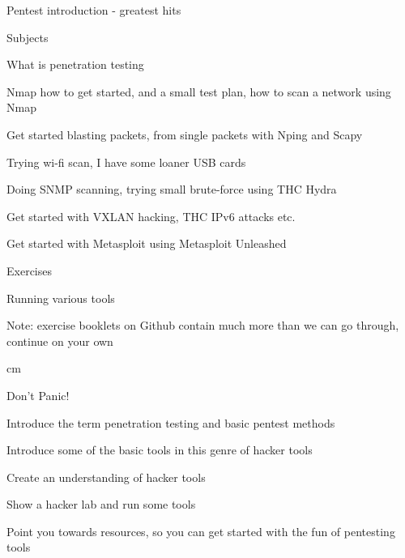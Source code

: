 \documentclass[Screen16to9,17pt]{foils}
\begin{document}
{}

\mytitlepage
{Pentest introduction - greatest hits}

\LogoOn



\begin{list1}
\item Subjects
\begin{list2}
\item What is penetration testing
\item Nmap how to get started, and a small test plan, how to scan a network using Nmap
\item Get started blasting packets, from single packets with Nping and Scapy
\item Trying wi-fi scan, I have some loaner USB cards
\item Doing SNMP scanning, trying small brute-force using THC Hydra
\item Get started with VXLAN hacking, THC IPv6 attacks etc.
\item Get started with Metasploit using Metasploit Unleashed
\end{list2}
\item Exercises
\begin{list2}
\item Running various tools
\item Note: exercise booklets on Github contain much more than we can go through, continue on your own
\end{list2}
\end{list1}





 cm

\centerline{\color{titlecolor}\LARGE Don't Panic!}


\begin{list1}
\item Introduce the term penetration testing and basic pentest methods
\item Introduce some of the basic tools in this genre of hacker tools
\item Create an understanding of hacker tools
\item Show a hacker lab and run some tools
\item Point you towards resources, so you can get started with the fun of pentesting tools
\end{list1}
\end{document}

